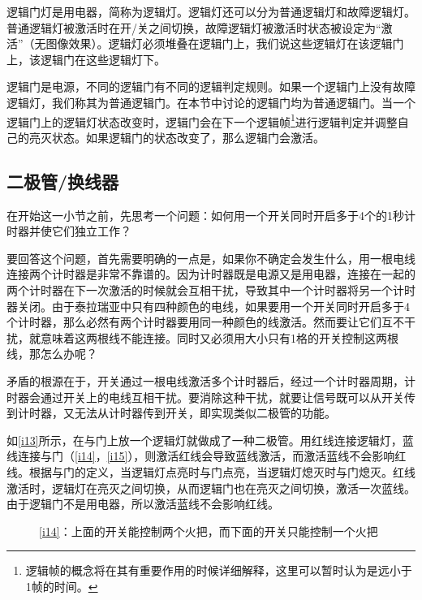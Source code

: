 逻辑门灯是用电器，简称为逻辑灯。逻辑灯还可以分为普通逻辑灯和故障逻辑灯。普通逻辑灯被激活时在开/关之间切换，故障逻辑灯被激活时状态被设定为“激活”（无图像效果）。逻辑灯必须堆叠在逻辑门上，我们说这些逻辑灯在该逻辑门上，该逻辑门在这些逻辑灯下。

逻辑门是电源，不同的逻辑门有不同的逻辑判定规则。如果一个逻辑门上没有故障逻辑灯，我们称其为普通逻辑门。在本节中讨论的逻辑门均为普通逻辑门。当一个逻辑门上的逻辑灯状态改变时，逻辑门会在下一个逻辑帧\footnote{逻辑帧的概念将在其有重要作用的时候详细解释，这里可以暂时认为是远小于1帧的时间。}进行逻辑判定并调整自己的亮灭状态。如果逻辑门的状态改变了，那么逻辑门会激活。

\subsection{二极管/换线器}

在开始这一小节之前，先思考一个问题：如何用一个开关同时开启多于4个的1秒计时器并使它们独立工作？

要回答这个问题，首先需要明确的一点是，如果你不确定会发生什么，用一根电线连接两个计时器是非常不靠谱的。因为计时器既是电源又是用电器，连接在一起的两个计时器在下一次激活的时候就会互相干扰，导致其中一个计时器将另一个计时器关闭。由于泰拉瑞亚中只有四种颜色的电线，如果要用一个开关同时开启多于4个计时器，那么必然有两个计时器要用同一种颜色的线激活。然而要让它们互不干扰，就意味着这两根线不能连接。同时又必须用大小只有1格的开关控制这两根线，那怎么办呢？

矛盾的根源在于，开关通过一根电线激活多个计时器后，经过一个计时器周期，计时器会通过开关上的电线互相干扰。要消除这种干扰，就要让信号既可以从开关传到计时器，又无法从计时器传到开关，即实现类似二极管的功能。

如\autoref{i13}所示，在与门上放一个逻辑灯就做成了一种二极管。用红线连接逻辑灯，蓝线连接与门（\autoref{i14}，\autoref{i15}），则激活红线会导致蓝线激活，而激活蓝线不会影响红线。根据与门的定义，当逻辑灯点亮时与门点亮，当逻辑灯熄灭时与门熄灭。红线激活时，逻辑灯在亮灭之间切换，从而逻辑门也在亮灭之间切换，激活一次蓝线。由于逻辑门不是用电器，所以激活蓝线不会影响红线。

\begin{figure}[!ht]
\begin{center}
\qquad
{}
\end{center}
\caption{\ref{i14}\protect{}：上面的开关能控制两个火把，而下面的开关只能控制一个火把}
\label{i13:15}
\end{figure}

